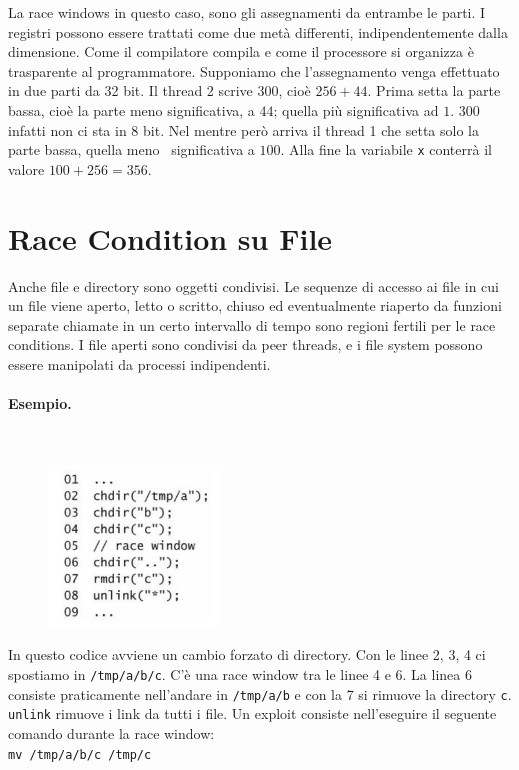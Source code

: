 La race windows in questo caso, sono gli assegnamenti da entrambe le parti.
I registri possono essere
trattati come due metà differenti, indipendentemente dalla dimensione.
Come il compilatore
compila e come il processore si organizza è trasparente al programmatore.
Supponiamo che l'assegnamento venga effettuato in due parti da 32 bit.
Il thread 2 scrive 300, cioè $256+44$. Prima setta la parte bassa,
cioè la parte meno
significativa, a $44$; quella più significativa ad $1$.
$300$ infatti non ci sta in 8 bit.
Nel mentre però arriva il thread 1 che setta solo la parte bassa, quella meno \
significativa a $100$.
Alla fine la variabile \verb|x| conterrà il valore $100+256=356$.

\section{Race Condition su File}

Anche file e directory sono oggetti condivisi.
Le sequenze di accesso ai file in cui un file viene aperto, letto o scritto,
chiuso ed
eventualmente riaperto da funzioni separate chiamate in un certo intervallo di
tempo sono
regioni fertili per le race conditions. I file aperti sono condivisi da
peer threads, e i file system
possono essere manipolati da processi indipendenti.

\paragraph{Esempio.}\ \\

\begin{figure}
    \centering
    \includegraphics[width=0.4\textwidth, keepaspectratio]{capitoli/secure_coding/img/cap_6/esempio_dir.png}
\end{figure}

In questo codice avviene un cambio forzato di directory.
Con le linee 2, 3, 4 ci spostiamo in
\verb|/tmp/a/b/c|.
C'è una race window tra le linee 4 e 6. La linea 6 consiste
praticamente nell'andare in \verb|/tmp/a/b| e con la 7 si rimuove la
directory \verb|c|. \verb|unlink| rimuove i link da tutti i file.
Un exploit consiste nell'eseguire il seguente comando durante
la race window:\\
\verb|mv /tmp/a/b/c /tmp/c|\\

